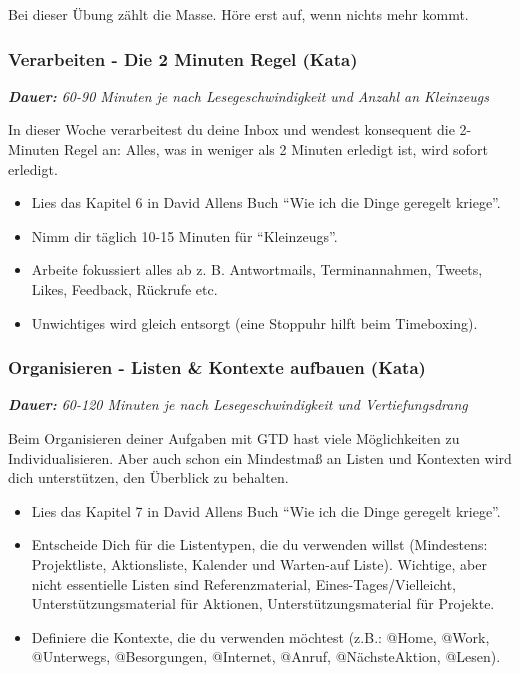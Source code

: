 \documentclass[
  ngerman,
  paper=a4,
,captions=tableheading
]{scrartcl}
\providecommand{\tightlist}{%
  \setlength{\itemsep}{0pt}\setlength{\parskip}{0pt}}
\begin{document}
Bei dieser Übung zählt die Masse. Höre erst auf, wenn nichts mehr kommt.

\hypertarget{verarbeiten---die-2-minuten-regel-kata}{%
\subsubsection{Verarbeiten - Die 2 Minuten Regel
(Kata)}\label{verarbeiten---die-2-minuten-regel-kata}}

\emph{\textbf{Dauer:} 60-90 Minuten je nach Lesegeschwindigkeit und
Anzahl an Kleinzeugs}

In dieser Woche verarbeitest du deine Inbox und wendest konsequent die
2-Minuten Regel an: Alles, was in weniger als 2 Minuten erledigt ist,
wird sofort erledigt.

\begin{itemize}
\item
  Lies das Kapitel 6 in David Allens Buch ``Wie ich die Dinge geregelt
  kriege''.
\item
  Nimm dir täglich 10-15 Minuten für ``Kleinzeugs''.
\item
  Arbeite fokussiert alles ab z. B. Antwortmails, Terminannahmen,
  Tweets, Likes, Feedback, Rückrufe etc.
\item
  Unwichtiges wird gleich entsorgt (eine Stoppuhr hilft beim
  Timeboxing).
\end{itemize}

\hypertarget{organisieren---listen-kontexte-aufbauen-kata}{%
\subsubsection{Organisieren - Listen \& Kontexte aufbauen
(Kata)}\label{organisieren---listen-kontexte-aufbauen-kata}}

\emph{\textbf{Dauer:} 60-120 Minuten je nach Lesegeschwindigkeit und
Vertiefungsdrang}

Beim Organisieren deiner Aufgaben mit GTD hast viele Möglichkeiten zu
Individualisieren. Aber auch schon ein Mindestmaß an Listen und
Kontexten wird dich unterstützen, den Überblick zu behalten.

\begin{itemize}
\tightlist
\item
  Lies das Kapitel 7 in David Allens Buch ``Wie ich die Dinge geregelt
  kriege''.
\item
  Entscheide Dich für die Listentypen, die du verwenden willst
  (Mindestens: Projektliste, Aktionsliste, Kalender und Warten-auf
  Liste). Wichtige, aber nicht essentielle Listen sind Referenzmaterial,
  Eines-Tages/Vielleicht, Unterstützungsmaterial für Aktionen,
  Unterstützungsmaterial für Projekte.
\item
  Definiere die Kontexte, die du verwenden möchtest (z.B.: @Home, @Work,
  @Unterwegs, @Besorgungen, @Internet, @Anruf, @NächsteAktion, @Lesen).
\end{itemize}
\end{document}
